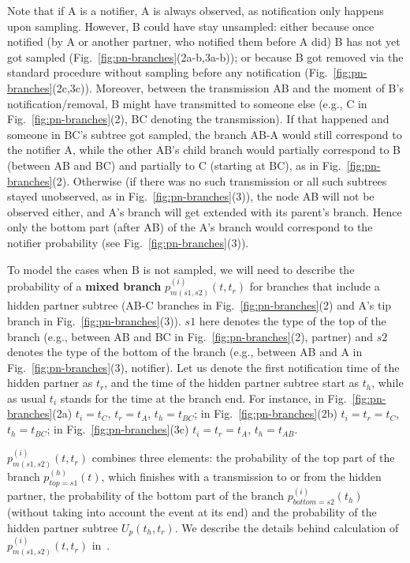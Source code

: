 \documentclass[10pt,letterpaper]{article}
\begin{document}
Note that if A is a notifier, A is always observed, as notification only happens upon sampling. However, B could have stay unsampled: either because once notified (by A or another partner, who notified them before A did) B has not yet got sampled (Fig.~\ref{fig:pn-branches}(2a-b,3a-b)); or because B got removed via the standard procedure without sampling before any notification (Fig.~\ref{fig:pn-branches}(2c,3c)). Moreover, between the transmission AB and the moment of B's notification/removal, B might have transmitted to someone else (e.g., C in Fig.~\ref{fig:pn-branches}(2), BC denoting the transmission). If that happened and someone in BC's subtree got sampled, the branch AB-A would still correspond to the notifier A, while the other AB's child branch would partially correspond to B (between AB and BC) and partially to C (starting at BC), as in Fig.~\ref{fig:pn-branches}(2). Otherwise (if there was no such transmission or all such subtrees stayed unobserved, as in Fig.~\ref{fig:pn-branches}(3)), the node AB will not be observed either, and A's branch will get extended with its parent's branch. Hence only the bottom part (after AB) of the A's branch would correspond to the notifier probability (see Fig.~\ref{fig:pn-branches}(3)).



To model the cases when B is not sampled, we will need to describe the probability of a \textbf{mixed branch} $p_{m(s1,s2)}^{(i)}(t,t_r)$ for branches that include a hidden partner subtree (AB-C branches in Fig.~\ref{fig:pn-branches}(2) and A's tip branch in Fig.~\ref{fig:pn-branches}(3)). $s1$ here denotes the type of the top of the branch (e.g., between AB and BC in Fig.~\ref{fig:pn-branches}(2), partner) and $s2$ denotes the type of the bottom of the branch (e.g., between AB and A in Fig.~\ref{fig:pn-branches}(3), notifier). Let us denote the first notification time of the hidden partner as $t_r$, and the time of the hidden partner subtree start as $t_h$, while as usual $t_i$ stands for the time at the branch end.  For instance, in Fig.~\ref{fig:pn-branches}(2a) $t_i=t_C$, $t_r=t_A$, $t_h=t_{BC}$; in Fig.~\ref{fig:pn-branches}(2b) $t_i=t_r=t_C$, $t_h=t_{BC}$; in Fig.~\ref{fig:pn-branches}(3c) $t_i=t_r=t_A$, $t_h=t_{AB}$. 

$p_{m(s1,s2)}^{(i)}(t,t_r)$ combines three elements: the probability of the top part of the branch $p_{top=s1}^{(h)}(t)$, which finishes with a transmission to or from the hidden partner, the probability of the bottom part of the branch $p_{bottom=s2}^{(i)}(t_h)$ (without taking into account the event at its end) and the probability of the hidden partner subtree $U_p(t_h,t_r)$. We describe the details behind calculation of $p_{m(s1,s2)}^{(i)}(t,t_r)$ in~. %
\end{document}
